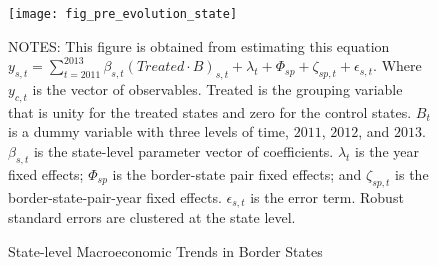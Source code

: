 \begin{figure}[H]
    \centering
    \texttt{[image: fig\_pre\_evolution\_state]}
    \caption{State-level Macroeconomic Trends in Border States}
    \label{fig:state-level-macroeconomic-trends-in-border-states}
    \begin{minipage}{18cm}
        \vspace{0.05in}
        {NOTES: This figure is obtained from estimating this equation $y_{s,t} = \sum_{t = 2011}^{2013} \beta_{s,t} (Treated \cdot B)_{s,t} + \lambda_{t} + \Phi_{sp} + \zeta_{sp,t} + \epsilon_{s,t}$. Where $y_{c,t}$ is the vector of observables. Treated is the grouping variable that is unity for the treated states and zero for the control states. $B_{t}$ is a dummy variable with three levels of time, $2011$, $2012$, and $2013$. $\beta_{s,t}$ is the state-level parameter vector of coefficients. $\lambda_{t}$ is the year fixed effects; $\Phi_{sp}$ is the border-state pair fixed effects; and $\zeta_{sp,t}$ is the border-state-pair-year fixed effects. $\epsilon_{s,t}$ is the error term. Robust standard errors are clustered at the state level. \par}
    \end{minipage}
\end{figure}